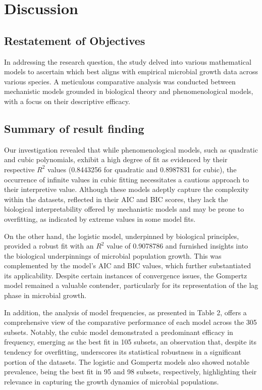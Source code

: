 \documentclass[11pt]{article}
\begin{document}
\section{Discussion}
\subsection{Restatement of Objectives}
In addressing the research question, the study delved into various mathematical models to ascertain which best aligns with empirical microbial growth data across various species. A meticulous comparative analysis was conducted between mechanistic models grounded in biological theory and phenomenological models, with a focus on their descriptive efficacy.
\subsection{Summary of result finding}

Our investigation revealed that while phenomenological models, such as quadratic and cubic polynomials, exhibit a high degree of fit as evidenced by their respective \( R^2 \) values (0.8443256 for quadratic and 0.8987831 for cubic), the occurrence of infinite values in cubic fitting necessitates a cautious approach to their interpretive value. Although these models adeptly capture the complexity within the datasets, reflected in their AIC and BIC scores, they lack the biological interpretability offered by mechanistic models and may be prone to overfitting, as indicated by extreme values in some model fits.

\hfill\break
On the other hand, the logistic model, underpinned by biological principles, provided a robust fit with an \( R^2 \) value of 0.9078786 and furnished insights into the biological underpinnings of microbial population growth. This was complemented by the model's AIC and BIC values, which further substantiated its applicability. Despite certain instances of convergence issues, the Gompertz model remained a valuable contender, particularly for its representation of the lag phase in microbial growth.

\hfill\break
In addition, the analysis of model frequencies, as presented in Table 2, offers a comprehensive view of the comparative performance of each model across the 305 subsets. Notably, the cubic model demonstrated a predominant efficacy in frequency, emerging as the best fit in 105 subsets, an observation that, despite its tendency for overfitting, underscores its statistical robustness in a significant portion of the datasets. The logistic and Gompertz models also showed notable prevalence, being the best fit in 95 and 98 subsets, respectively, highlighting their relevance in capturing the growth dynamics of microbial populations. 
\end{document}
